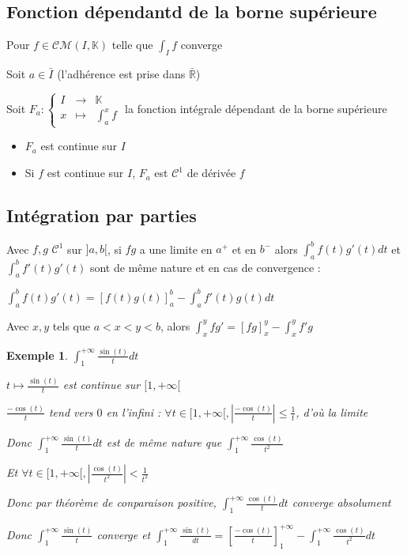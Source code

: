 \documentclass[a4paper,12pt]{book}
\newcommand{\Thr}[2]{\begin{tcolorbox}[sharp corners, colback=white,colframe=red!90!black!75, title=Théorème : #1]#2\end{tcolorbox}}
\newcommand{\Prop}[2]{\begin{tcolorbox}[sharp corners, colback=white,colframe=red!90!black!75, title=Proposition : #1]#2\end{tcolorbox}}
\newcommand{\Pre}[1]{\begin{tcolorbox}[sharp corners, colback=white,colframe=green!60!green!30!black!75, title=Preuve]#1\end{tcolorbox}}
\newtheorem{Exe}{Exemple}[section]
\def\R{\mathbb{R}}
\def\K{\mathbb{K}}
\begin{document}
\subsection{Fonction dépendantd de la borne supérieure}
\Prop{}{Pour $f\in\mathcal{CM}(I,\K)$ telle que $\int_If$ converge \par Soit $a\in\bar{I}$ (l'adhérence est prise dans $\bar{\R}$) \par Soit $F_a:\left\{\begin{array}{rcl} I & \to & \K \\ x & \mapsto & \int_a^xf \end{array}\right.$ la fonction intégrale dépendant de la borne supérieure\begin{itemize}
\item $F_a$ est continue sur $I$
\item Si $f$ est continue sur $I$, $F_a$ est $\mathcal{C}^1$ de dérivée $f$
\end{itemize}}

\subsection{Intégration par parties}
\Thr{Intégration par parties}{Avec $f,g$ $\mathcal{C}^1$ sur $]a,b[$,  si $fg$ a une limite en $a^+$ et en $b^-$ alors $\int_a^bf(t)g'(t)dt$ et $\int_a^bf'(t)g'(t)$ sont de même nature et en cas de convergence :\par \begin{center}$\int_a^bf(t)g'(t) = [f(t)g(t)]_a^b -\int_a^bf'(t)g(t)dt$ \end{center}}
\Pre{Avec $x,y$ tels que $a<x<y<b$, alors $\int_x^yfg' = [fg]_x^y - \int_x^yf'g$}
\begin{Exe}
$\int_1^{+\infty}\frac{\sin(t)}{t}dt$ \par $t\mapsto \frac{\sin(t)}{t}$ est continue sur $[1,+\infty[$ \par $\frac{-\cos(t)}{t}$ tend vers $0$ en l'infini : $\forall t\in [1, +\infty[, \left\vert\frac{-\cos(t)}{t}\right\vert\leq \frac{1}{t}$, d'où la limite \par Donc $\int_1^{+\infty}\frac{\sin(t)}{t}dt$ est de même nature que $\int_1^{+\infty}\frac{\cos(t)}{t^2}$ \par Et $\forall t\in[1, +\infty[,\left\vert\frac{\cos(t)}{t^2}\right\vert<\frac{1}{t^2}$ \par Donc par théorème de conparaison positive, $\int_1^{+\infty}\frac{\cos(t)}{t}dt$ converge absolument \par Donc $\int_1^{+\infty}\frac{\sin(t)}{t}$ converge et $\int_1^{+\infty}\frac{\sin(t)}{dt} = \left[\frac{-\cos(t)}{t}\right]_1^{+\infty} - \int_1^{+\infty}\frac{\cos(t)}{t^2}dt$
\end{Exe}
\end{document}
